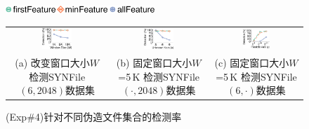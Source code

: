 \begin{figure}[!htb]
    \centering
    \includegraphics[width=0.5\textwidth]{pic/featurespy/plot/detection/trade-off/trade_off_legend.pdf}
    \vspace{5pt} \\
    \begin{tabular}{@{\ }c@{\ }c@{\ }c}
        \includegraphics[width=0.32\textwidth]{pic/featurespy/plot/detection/trade-off/varyWindow_linux.pdf}    &
        \includegraphics[width=0.32\textwidth]{pic/featurespy/plot/detection/trade-off/varyModifyPos_linux.pdf} &
        \includegraphics[width=0.32\textwidth]{pic/featurespy/plot/detection/trade-off/varyFileNumber_linux.pdf}  \\
        \makecell[c]{\small (a) 改变窗口大小$W$                                                                   \\ \small 检测SYNFile$(6,2048)$数据集} &
        \makecell[c]{\small (b) 固定窗口大小$W$=5\,K                                                              \\ \small 检测SYNFile$(\cdot,2048)$数据集} &
        \makecell[c]{\small (c) 固定窗口大小$W$=5\,K                                                              \\ \small 检测SYNFile$(6,\cdot)$数据集} \\
    \end{tabular}
    \caption{(Exp\#4)针对不同伪造文件集合的检测率}
    \label{fig:featurespy-expDetectionTradeOff}
\end{figure}

